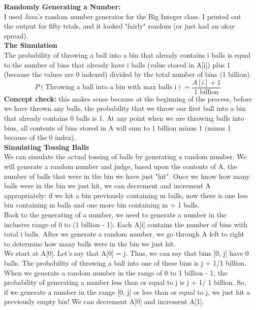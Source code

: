 \documentclass[11pt, solution, letterpaper]{format}
\begin{document}
\textbf{Randomly Generating a Number:}\\
I used Java's random number generator for the Big Integer class. I printed out the output for fifty trials, and it looked "fairly" random (or just had an okay spread).\\

\textbf{The Simulation}\\
The probability of throwing a ball into a bin that already contains i balls is equal to the number of bins that already have i balls (value stored in A[i]) plus 1 (because the values are 0 indexed) divided by the total number of bins (1 billion). 
$$ P(\text{Throwing a ball into a bin with max balls i}) = \frac{A[i] + 1}{1 \text{ billion}}$$
\textbf{Concept check:} this makes sense because at the beginning of the process, before we have thrown any balls, the probability that we throw our first ball into a bin that already contains 0 balls is 1. At any point when we are throwing balls into bins, all contents of bins stored in A will sum to 1 billion minus 1 (minus 1 because of the 0 index). \\


\textbf{Simulating Tossing Balls}\\
We can simulate the actual tossing of balls by generating a random number. We will generate a random number and judge, based upon the contents of A, the number of balls that were in the bin we have just "hit".  Once we know how many balls were in the bin we just hit, we can decrement and increment A appropriately: if we hit a bin previously containing m balls, now there is one less bin containing m balls and one more bin containing m + 1 balls. \\


Back to the generating of a number, we need to generate a number in the inclusive range of 0 to (1 billion - 1). Each A[i] contains the number of bins with total i balls. After we generate a random number, we go through A left to right to determine how many balls were in the bin we just hit. \\

We start at A[0]. Let's say that A[0] = j.  Thus, we can say that bins [0, j] have 0 balls. The probability of throwing a ball into one of these bins is j + 1/1 billion. When we generate a random number in the range of 0 to 1 billion - 1, the probability of generating a number less than or equal to j is j + 1/ 1 billion. So, if we generate a number in the range [0, j] or less than or equal to j, we just hit a previously empty bin! We can decrement A[0] and increment A[1]. \\
\end{document}
